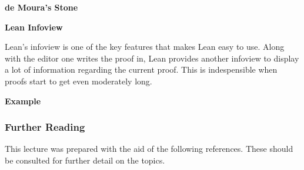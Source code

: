 \documentclass{beamer}
\theoremstyle{indentDefn} \newtheorem{defn}[]{Definition}
\begin{document}




\vfill
\newpage
\textbf{de Moura's Stone}



\vfill
\newpage
\textbf{Lean Infoview}

Lean's infoview is one of the key features that makes Lean easy to use. Along with the editor one writes the proof in, Lean provides another infoview to display a lot of information regarding the current proof. This is indespensible when proofs start to get even moderately long. 


\vfill
\newpage
\textbf{Example}


\begin{frame}
	\frametitle{Further Reading}
	
    This lecture was prepared with the aid of the following references. 
    These should be consulted for further detail on the topics. 

    \printbibliography
	
\end{frame}
\end{document}
